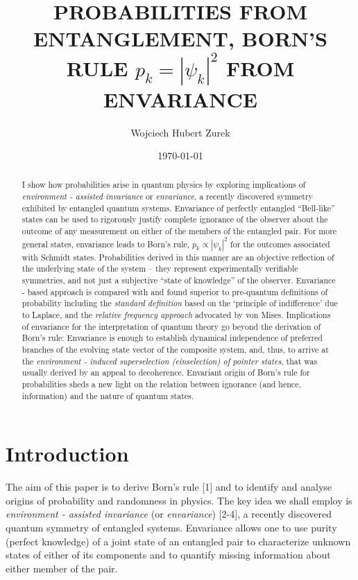\documentclass[aps,twocolumn,pra,epsfig]{revtex4}
\begin{document}
\title{ PROBABILITIES FROM ENTANGLEMENT, BORN'S RULE $p_k=|\psi_k|^2$ FROM ENVARIANCE}
\author{Wojciech Hubert Zurek}

    \address{Theory Division, MS B210, LANL
    Los Alamos, NM, 87545, U.S.A.}

\date{\today}

\begin{abstract}
I show how probabilities arise in quantum physics by exploring implications
of {\it environment - assisted invariance} or {\it envariance},
a recently discovered symmetry exhibited by entangled quantum systems.
Envariance of perfectly entangled ``Bell-like'' states can be used to rigorously justify
complete ignorance of the observer about the outcome of any measurement
on either of the members of the entangled pair. For more general states, envariance 
leads to Born's rule, $p_k \propto |\psi_k|^2$ for the outcomes associated with
Schmidt states. Probabilities derived in this manner are an
objective reflection of the underlying state of the system -- they represent
experimentally verifiable symmetries, and not just a subjective ``state of
knowledge'' of the observer. Envariance - based approach is compared with
and found superior to pre-quantum definitions of probability including
the {\it standard definition} based on the `principle of indifference' due
to Laplace, and the {\it relative frequency approach} advocated by von Mises.
Implications of envariance for the interpretation of quantum theory go beyond
the derivation of Born's rule: Envariance is enough to establish dynamical
independence of preferred branches of the evolving state vector of
the composite system, and, thus, to arrive at the {\it environment - induced
superselection (einselection) of pointer states}, that was usually derived
by an appeal to decoherence. Envariant origin of Born's rule for probabilities
sheds a new light on the relation between ignorance (and hence, information)
and the nature of quantum states.
\end{abstract}
\maketitle
\section{Introduction}

The aim of this paper is to derive Born's rule [1] and to identify and analyse
origins of probability and randomness in physics. The key idea we shall employ
is {\it environment - assisted invariance} (or {\it envariance}) [2-4],
a recently discovered quantum symmetry of entangled systems.  Envariance
allows one to use purity (perfect knowledge) of a joint state of an entangled pair 
to characterize unknown states of either of its components and to quantify
missing information about either member of the pair.
\end{document}
